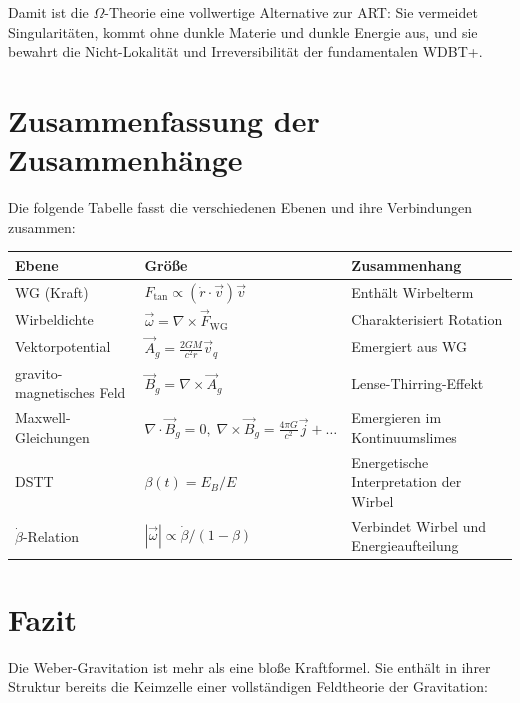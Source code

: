 Damit ist die \( \Omega \)-Theorie eine vollwertige Alternative zur ART: Sie vermeidet Singularitäten, kommt ohne dunkle Materie und dunkle Energie aus, und sie bewahrt die Nicht-Lokalität und Irreversibilität der fundamentalen WDBT+.

\section{Zusammenfassung der Zusammenhänge}
\label{sec:mg_zusammenhaenge}

Die folgende Tabelle fasst die verschiedenen Ebenen und ihre Verbindungen zusammen:

\begin{tabular}{|l|l|l|}
\hline
\textbf{Ebene} & \textbf{Größe} & \textbf{Zusammenhang} \\
\hline
WG (Kraft) & \(F_{\text{tan}} \propto (\dot{r} \cdot \vec{v})\vec{v}\) & Enthält Wirbelterm \\
Wirbeldichte & \(\vec{\omega} = \nabla \times \vec{F}_{\text{WG}}\) & Charakterisiert Rotation \\
Vektorpotential & \(\vec{A}_g = \frac{2GM}{c^2 r} \vec{v}_q\) & Emergiert aus WG \\
gravito-magnetisches Feld & \(\vec{B}_g = \nabla \times \vec{A}_g\) & Lense-Thirring-Effekt \\
Maxwell-Gleichungen & \(\nabla \cdot \vec{B}_g = 0,\; \nabla \times \vec{B}_g = \frac{4\pi G}{c^2} \vec{j} + \ldots\) & Emergieren im Kontinuumslimes \\
DSTT & \(\beta(t) = E_B/E\) & Energetische Interpretation der Wirbel \\
\(\dot{\beta}\)-Relation & \(|\vec{\omega}| \propto \dot{\beta}/(1-\beta)\) & Verbindet Wirbel und Energieaufteilung \\
\hline
\end{tabular}

\section{Fazit}
\label{sec:mg_fazit}

Die Weber-Gravitation ist mehr als eine bloße Kraftformel. Sie enthält in ihrer Struktur bereits die Keimzelle einer vollständigen Feldtheorie der Gravitation:

